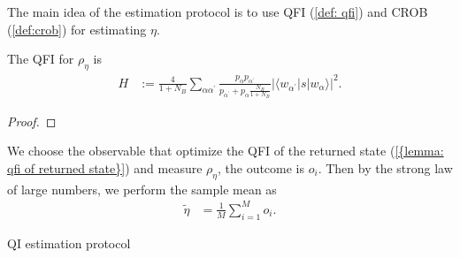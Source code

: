 \documentclass[../../note.tex]{subfiles}
\begin{document}
The main idea of the estimation protocol is to use QFI (\ref{def: qfi}) and CROB (\ref{def:crob}) for estimating $\eta$.
\begin{lemma}
    \label{lemma: qfi of returned state}
    The QFI for $\rho_{\eta}$ is
    \begin{align}
        H
        &:= \frac{4}{1+N_B} \sum_{\alpha \alpha^\prime} \frac{p_\alpha p_{\alpha^\prime}}{p_{\alpha^\prime} + p_{\alpha} \frac{N_B}{1+N_B}} \vert \langle w_{\alpha^\prime} \vert s \vert w_{\alpha} \rangle \vert^2.
    \end{align}
\end{lemma}
\begin{proof}
    
\end{proof}

We choose the observable that optimize the QFI of the returned state (\ref{{lemma: qfi of returned state}}) and measure $\rho_{\eta}$, the outcome is $o_i$. Then by the strong law of large numbers, we perform the sample mean as
\begin{align}
    \label{eq: estimation of eta}
    \tilde{\eta}
    &= \frac{1}{M} \sum_{i=1}^{M} o_i.
\end{align}

\begin{algorithm}[H]
    \caption{QI estimation protocol}
    \label{ptl: quantum illumination estimation protocol}
\end{algorithm}
\end{document}

